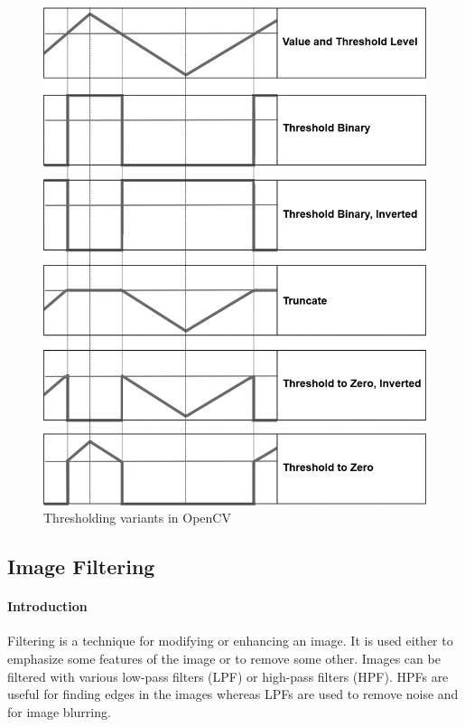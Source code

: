 
\begin{figure}[H]
	\centering
	\includegraphics[width=\textwidth]{images/thresholds}
	\caption{Thresholding variants in OpenCV}
\end{figure}

\subsection{Image Filtering}
\paragraph{Introduction}
Filtering is a technique for modifying or enhancing an image. It is used either to emphasize some features of the image or to remove some other. Images can be filtered with various low-pass filters (LPF) or high-pass filters (HPF). HPFs are useful for finding edges in the images whereas LPFs are used to remove noise and for image blurring.

